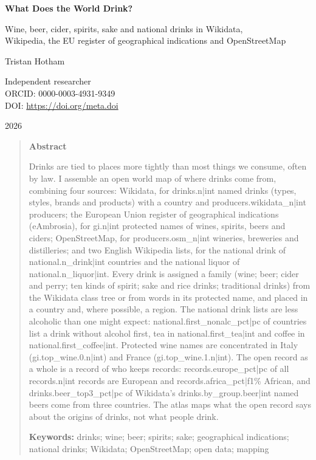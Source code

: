 \documentclass[11pt,a4paper]{article}
\begin{document}
\begin{center}
{\Large\bfseries What Does the World Drink?\par}
\vspace{0.4em}
{\large Wine, beer, cider, spirits, sake and national drinks in Wikidata,\\Wikipedia, the EU register of geographical indications and OpenStreetMap\par}
\vspace{1.2em}
{\large Tristan Hotham\par}
\vspace{0.3em}
{\small Independent researcher\\
ORCID: 0000-0003-4931-9349\\
DOI: \href{https://doi.org/{{meta.doi}}}{https://doi.org/{{meta.doi}}}\par}
\vspace{0.8em}
2026
\end{center}

\begin{quote}
\small
\begin{center}\textbf{Abstract}\end{center}
Drinks are tied to places more tightly than most things we consume, often by law. I assemble an open world map of where drinks come from, combining four sources: Wikidata, for {{drinks.n|int}} named drinks (types, styles, brands and products) with a country and {{producers.wikidata_n|int}} producers; the European Union register of geographical indications (eAmbrosia), for {{gi.n|int}} protected names of wines, spirits, beers and ciders; OpenStreetMap, for {{producers.osm_n|int}} wineries, breweries and distilleries; and two English Wikipedia lists, for the national drink of {{national.n_drink|int}} countries and the national liquor of {{national.n_liquor|int}}. Every drink is assigned a family (wine; beer; cider and perry; ten kinds of spirit; sake and rice drinks; traditional drinks) from the Wikidata class tree or from words in its protected name, and placed in a country and, where possible, a region. The national drink lists are less alcoholic than one might expect: {{national.first_nonalc_pct|pc}} of countries list a drink without alcohol first, tea in {{national.first_tea|int}} and coffee in {{national.first_coffee|int}}. Protected wine names are concentrated in Italy ({{gi.top_wine.0.n|int}}) and France ({{gi.top_wine.1.n|int}}). The open record as a whole is a record of who keeps records: {{records.europe_pct|pc}} of all {{records.n|int}} records are European and {{records.africa_pct|f1}}\% African, and {{drinks.beer_top3_pct|pc}} of Wikidata's {{drinks.by_group.beer|int}} named beers come from three countries. The atlas maps what the open record says about the origins of drinks, not what people drink.

\textbf{Keywords:} drinks; wine; beer; spirits; sake; geographical indications; national drinks; Wikidata; OpenStreetMap; open data; mapping
\end{quote}
\end{document}
